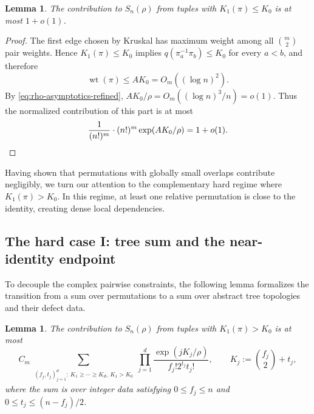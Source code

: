\documentclass[10pt,a4paper]{amsart}
\newtheorem{lemma}[theorem]{Lemma}
\renewcommand\le{\leqslant}
\renewcommand\ge{\geqslant}
\newcommand{\wt}{\operatorname{wt}}
\begin{document}
\begin{lemma}\label{lem:low-weight-part-detailed}
The contribution to $S_n(\rho)$ from tuples with $K_1(\pi)\le K_0$ is at most $1+o(1)$.
\end{lemma}

\begin{proof}
The first edge chosen by Kruskal has maximum weight among all $\binom m2$ pair weights. Hence $K_1(\pi)\le K_0$ implies $q(\pi_a^{-1}\pi_b)\le K_0$ for every $a<b$, and therefore
\[
        \wt(\pi)\le AK_0=O_m((\log n)^2).
\]
By \eqref{eq:rho-asymptotics-refined}, $AK_0/\rho=O_m((\log n)^3/n)=o(1)$. Thus the normalized contribution of this part is at most
\[
\frac1{(n!)^m}\cdot (n!)^m\exp(AK_0/\rho)=1+o(1).
\qedhere\]
\end{proof}

Having shown that permutations with globally small overlaps contribute negligibly, we turn our attention to the complementary hard regime where \(K_1(\pi)>K_0\). In this regime, at least one relative permutation is close to the identity, creating dense local dependencies.

\medskip

\subsection{The hard case I: tree sum and the near-identity endpoint}\label{subsec:hard_regime_near}

To decouple the complex pairwise constraints, the following lemma formalizes the transition from a sum over permutations to a sum over abstract tree topologies and their defect data.

\begin{lemma}\label{lem:tree-data-overcount-detailed}
The contribution to $S_n(\rho)$ from tuples with $K_1(\pi)>K_0$ is at most
\begin{equation}\label{eq:exact-ft-tree-sum}
 C_m
 \sum_{\substack{(f_j,t_j)_{j=1}^d:\ K_1\ge\cdots\ge K_d,
 \ K_1>K_0}}\prod_{j=1}^d
\frac{\exp(jK_j/\rho)}{f_j!2^{t_j}t_j!},
\qquad K_j:=\binom{f_j}2+t_j,
\end{equation}
where the sum is over integer data satisfying $0\le f_j\le n$ and $0\le t_j\le (n-f_j)/2$.
\end{lemma}
\end{document}
